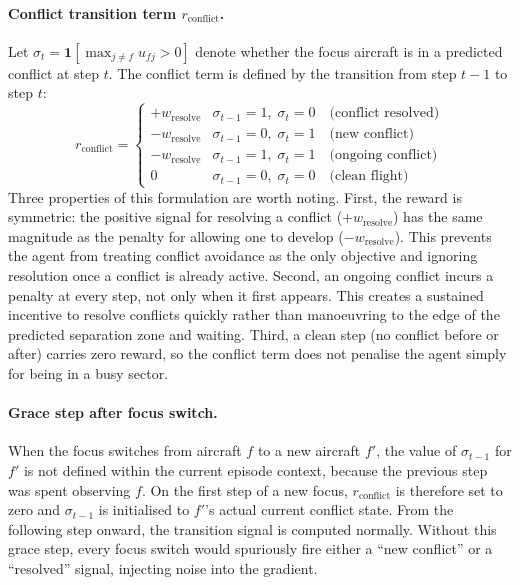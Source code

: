 \documentclass[11pt, a4paper]{article}
\begin{document}
\paragraph{Conflict transition term $r_\text{conflict}$.}
Let $\sigma_t = \mathbf{1}[\max_{j \neq f} u_{fj} > 0]$ denote whether the
focus aircraft is in a predicted conflict at step $t$.
The conflict term is defined by the transition from step $t-1$ to step $t$:
\begin{equation}
    r_\text{conflict} =
    \begin{cases}
        +w_\text{resolve} & \sigma_{t-1}=1,\;\sigma_t=0 \quad\text{(conflict resolved)}\\
        -w_\text{resolve} & \sigma_{t-1}=0,\;\sigma_t=1 \quad\text{(new conflict)}\\
        -w_\text{resolve} & \sigma_{t-1}=1,\;\sigma_t=1 \quad\text{(ongoing conflict)}\\
        0 & \sigma_{t-1}=0,\;\sigma_t=0 \quad\text{(clean flight)}
    \end{cases}
    \label{eq:r_conflict}
\end{equation}
Three properties of this formulation are worth noting.
First, the reward is symmetric: the positive signal for resolving a conflict
($+w_\text{resolve}$) has the same magnitude as the penalty for allowing one
to develop ($-w_\text{resolve}$).
This prevents the agent from treating conflict avoidance as the only objective
and ignoring resolution once a conflict is already active.
Second, an ongoing conflict incurs a penalty at every step, not only when it
first appears.
This creates a sustained incentive to resolve conflicts quickly rather than
manoeuvring to the edge of the predicted separation zone and waiting.
Third, a clean step (no conflict before or after) carries zero reward, so
the conflict term does not penalise the agent simply for being in a busy
sector.

\paragraph{Grace step after focus switch.}
When the focus switches from aircraft $f$ to a new aircraft $f'$, the value
of $\sigma_{t-1}$ for $f'$ is not defined within the current episode context,
because the previous step was spent observing $f$.
On the first step of a new focus, $r_\text{conflict}$ is therefore set to zero
and $\sigma_{t-1}$ is initialised to $f'$'s actual current conflict state.
From the following step onward, the transition signal is computed normally.
Without this grace step, every focus switch would spuriously fire either a
``new conflict'' or a ``resolved'' signal, injecting noise into the gradient.
\end{document}
